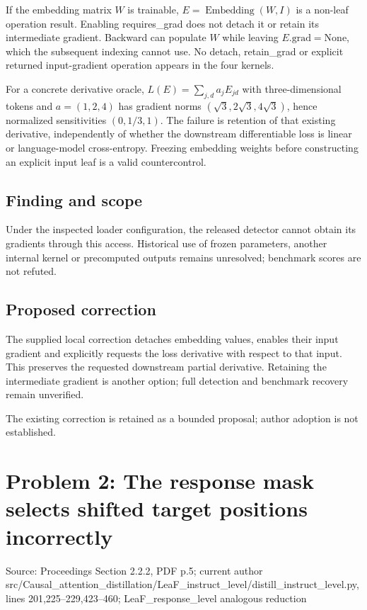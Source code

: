 \documentclass[11pt]{article}
\begin{document}
If the embedding matrix \(W\) is trainable, \(E=\operatorname{Embedding}(W,I)\) is a non-leaf operation result. Enabling requires\_grad does not detach it or retain its intermediate gradient. Backward can populate \(W\) while leaving \(E.\mathrm{grad}=\mathrm{None}\), which the subsequent indexing cannot use. No detach, retain\_grad or explicit returned input-gradient operation appears in the four kernels.

For a concrete derivative oracle, \(L(E)=\sum_{j,d}a_jE_{jd}\) with three-dimensional tokens and \(a=(1,2,4)\) has gradient norms \((\sqrt3,2\sqrt3,4\sqrt3)\), hence normalized sensitivities \((0,1/3,1)\). The failure is retention of that existing derivative, independently of whether the downstream differentiable loss is linear or language-model cross-entropy. Freezing embedding weights before constructing an explicit input leaf is a valid countercontrol.

\subsection*{Finding and scope}

Under the inspected loader configuration, the released detector cannot obtain its gradients through this access. Historical use of frozen parameters, another internal kernel or precomputed outputs remains unresolved; benchmark scores are not refuted.

\subsection*{Proposed correction}

The supplied local correction detaches embedding values, enables their input gradient and explicitly requests the loss derivative with respect to that input. This preserves the requested downstream partial derivative. Retaining the intermediate gradient is another option; full detection and benchmark recovery remain unverified.

The existing correction is retained as a bounded proposal; author adoption is not established.

\section*{Problem 2: The response mask selects shifted target positions incorrectly}

Source: Proceedings Section 2.2.2, PDF p.5; current author src/Causal\_attention\_distillation/LeaF\_instruct\_level/distill\_instruct\_level.py, lines 201,225–229,423–460; LeaF\_response\_level analogous reduction
\end{document}
